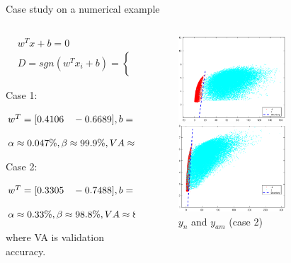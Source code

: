 \documentclass[10pt]{beamer}
\begin{document}
    
    \begin{frame}{Case study on a numerical example}
    \begin{columns}
             \begin{column}{0.5\textwidth}
 \begin{small}
\begin{equation} \nonumber
\begin{aligned}
& w^Tx+b=0  \\
& D=sgn(w^Tx_i+b) = \left\{ 
    \begin{aligned}
  & -1  \\
  &\quad 1 
  \end{aligned}
     \right.
\end{aligned}
\end{equation}
\end{small}
 Case 1: \par  $\small{w^T = [ 0.4106 \quad -0.6689]
 , b = -3.473} $\par $\small{\alpha \approx 0.047\%,\beta  \approx  99.9\%,VA \approx 99.93\%}$ \par 
Case 2:  \par $\small{w^T = [0.3305 \quad -0.7488]
 , b = -0.8336} $\par $\small{\alpha \approx 0.33\%  ,\beta  \approx  98.8 \%,VA \approx 89.83 \%}$ \par
 where VA is validation accuracy.
           \end{column}
        \begin{column}{0.5\textwidth} 
         \begin{figure}
        \centering
        \includegraphics[width=4cm]{fig/addHyper.eps}
        \caption{$y_n$ and $y_a$ (case 1)}
        \includegraphics[width=4cm]{fig/ALhyperplane.eps}
        \caption{$y_n$ and $y_{am}$ (case 2)}
        \end{figure}
        \end{column}
    \end{columns}
\end{frame}
\end{document}
